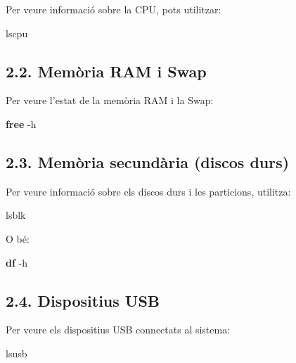 \documentclass[
  a4paper,
]{article}
\newenvironment{Shaded}{\begin{snugshade}}{\end{snugshade}}
\newcommand{\AttributeTok}[1]{\textcolor[rgb]{0.13,0.29,0.53}{#1}}
\newcommand{\ExtensionTok}[1]{#1}
\newcommand{\FunctionTok}[1]{\textcolor[rgb]{0.13,0.29,0.53}{\textbf{#1}}}
\begin{document}
Per veure informació sobre la CPU, pots utilitzar:

\begin{Shaded}
\begin{Highlighting}[]
\ExtensionTok{lscpu}
\end{Highlighting}
\end{Shaded}

\subsection{2.2. Memòria RAM i Swap}\label{memuxf2ria-ram-i-swap}

Per veure l'estat de la memòria RAM i la Swap:

\begin{Shaded}
\begin{Highlighting}[]
\FunctionTok{free} \AttributeTok{{-}h}
\end{Highlighting}
\end{Shaded}

\subsection{2.3. Memòria secundària (discos
durs)}\label{memuxf2ria-secunduxe0ria-discos-durs}

Per veure informació sobre els discos durs i les particions, utilitza:

\begin{Shaded}
\begin{Highlighting}[]
\ExtensionTok{lsblk}
\end{Highlighting}
\end{Shaded}

O bé:

\begin{Shaded}
\begin{Highlighting}[]
\FunctionTok{df} \AttributeTok{{-}h}
\end{Highlighting}
\end{Shaded}

\subsection{2.4. Dispositius USB}\label{dispositius-usb}

Per veure els dispositius USB connectats al sistema:

\begin{Shaded}
\begin{Highlighting}[]
\ExtensionTok{lsusb}
\end{Highlighting}
\end{Shaded}
\end{document}
